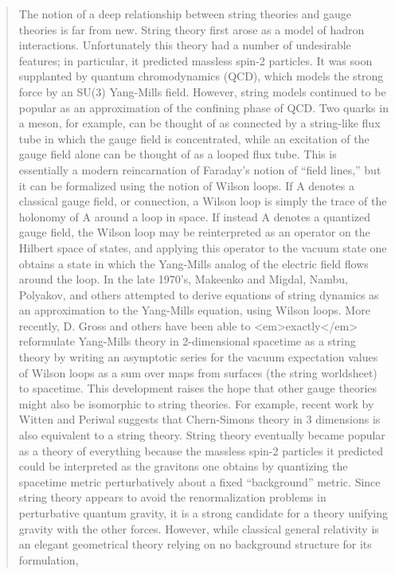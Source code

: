 \begin{quote}
The notion of a deep relationship between string theories
and gauge theories is far from new.  String theory first arose as a
model of hadron interactions.  Unfortunately this theory had a number of undesirable features; in particular, it predicted massless spin-2 particles.
It was soon supplanted by quantum chromodynamics (QCD), which models the
strong force by an SU(3) Yang-Mills field.   However, string
models continued to be popular as an approximation of the confining phase
of QCD.  Two quarks in a meson, for example, can be thought of as
connected by a string-like flux tube in which the gauge field is
concentrated, while an excitation of the gauge field alone can be
thought of as a looped flux tube.   This is essentially a modern
reincarnation of Faraday's notion of ``field lines,'' but it can be
formalized using the notion of Wilson loops.  If A denotes a classical
gauge field, or connection, a Wilson loop is simply the trace of the
holonomy of A around a loop in space.  If instead A denotes a quantized
gauge field, the Wilson loop may be reinterpreted as an operator on the
Hilbert space of states, and applying this operator to the vacuum state
one obtains a state in which the Yang-Mills analog of the electric field
flows around the loop.
In the late 1970's, Makeenko and Migdal, Nambu, Polyakov, and others
attempted to derive equations of string dynamics as an approximation to 
the Yang-Mills equation, using Wilson loops.   More recently, D. Gross
and others have been able to <em>exactly</em> reformulate Yang-Mills theory in
2-dimensional spacetime as a string theory by writing an asymptotic
series for the vacuum expectation values of Wilson loops as a sum over
maps from surfaces (the string worldsheet) to spacetime.   This
development raises the hope that other gauge theories might also be
isomorphic to string theories.  For example, recent work by Witten and
Periwal  suggests that Chern-Simons theory in 3 dimensions is also
equivalent to a string theory. 
String theory eventually became popular as a theory of everything
because the massless spin-2 particles it predicted could be interpreted
as the gravitons one obtains by quantizing the spacetime
metric perturbatively about a fixed ``background'' metric.  Since
string theory appears to avoid the renormalization problems in
perturbative quantum gravity, it is a strong candidate for a theory
unifying gravity with the other forces.  
However, while classical general relativity is an elegant
geometrical theory relying on no background structure for its formulation, 

\end{quote}
